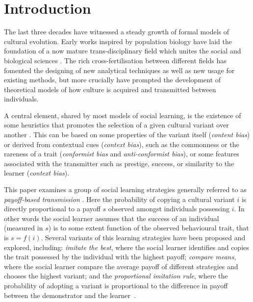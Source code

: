 \documentclass[3p,authoryear,twocolumn]{elsarticle} %
\begin{document}
\section{Introduction}

The last three decades have witnessed a steady growth of formal models of cultural evolution. Early works inspired by population biology \citep{cavallisforza_feldman_1981,boyd1985} have laid the foundation of a now mature trans-disciplinary field which unites the social and biological sciences \citep{mesoudi_etal_2006}. The rich cross-fertilisation between different fields has fomented the designing of new analytical techniques as well as new usage for existing methods, but more crucially have prompted the development of theoretical models of how culture is acquired and transmitted between individuals. %

A central element, shared by most models of social learning, is the existence of some heuristics that promotes the selection of a given cultural variant over another \citep{laland2004}. This can be based on some properties of the variant itself (\emph{content bias}) or derived from contextual cues (\emph{context bias}), such as the commonness or the rareness of a trait (\emph{conformist bias} and \emph{anti-conformist bias}), or some features associated with the transmitter such as prestige, success, or similarity to the learner (\emph{context bias})\citep{henrich_mcelreath2003}. 

This paper examines a group of social learning strategies generally referred to as \emph{payoff-based transmission} \citep{schlag1998,kendal_etal_2009,lake_and_crema_2012,baldini2013,kandler_and_laland_2013,crema_lake_inpress}. Here the probability of copying a cultural variant $i$ is directly proportional to a payoff $s$ observed amongst individuals possessing $i$. In other words the social learner assumes that the success of an individual (measured in $s$) is to some extent function of the observed behavioural trait, that is $s=f(i)$. Several variants of this learning strategies have been proposed and explored, including: \emph{imitate the best}, where the social learner identifies and copies the trait possessed by the individual with the highest payoff; \emph{compare means}, where the social learner compare the average payoff of different strategies and chooses the highest variant; and the \emph{proportional imitation rule}, where the probability of adopting a variant is proportional to the difference in payoff between the demonstrator and the learner~\citep{schlag1998,baldini2013}. 
\end{document}
